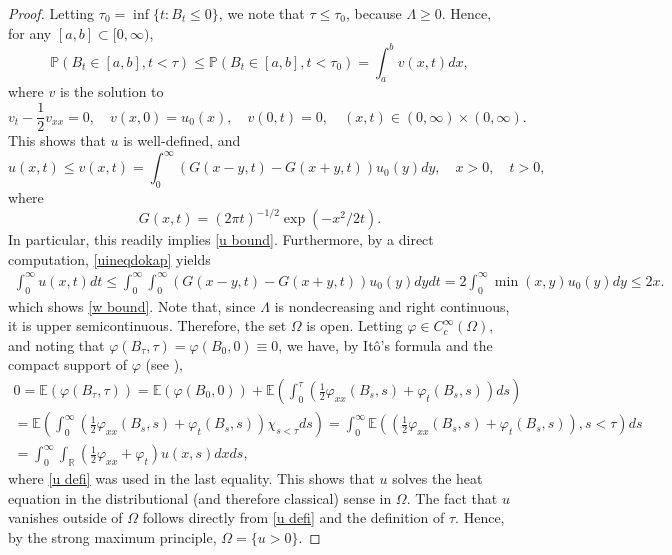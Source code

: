 \documentclass{article}
\numberwithin{equation}{section}
\numberwithin{figure}{section}
\theoremstyle{plain}
\theoremstyle{plain}
\theoremstyle{plain}
\theoremstyle{plain}
\theoremstyle{definition}
\theoremstyle{remark}
\def\R{{\mathbb{R}}}
\def\E{{\mathbb{E}}}
\def\P{{\mathbb{P}}}
\begin{document}
\begin{proof}  Letting $\tau_0=\inf\{t:B_t\leq 0\}$, we note that $\tau\leq \tau_0$, because $\Lambda\geq0$. Hence, for any $[a,b]\subset [0,\infty)$, 
\begin{equation}
   \P(B_t\in [a,b], t< \tau )\leq \P(B_t \in [a,b], t<\tau_0)=\int_{a}^bv(x,t)dx,
\end{equation}
where $v$ is the solution to
\[v_{t}-\frac12v_{xx}=0, \quad v(x,0)=u_0(x), \quad v(0,t)=0, \quad (x,t)\in (0,\infty) \times (0,\infty).\]
This shows that $u$ is well-defined, and
\begin{equation} \label{uineqdokap}
    u(x,t)\leq v(x,t)= \int_{0}^{\infty}(G(x-y,t)-G(x+y,t))u_0(y)dy, \quad x>0, \quad  t>0,
\end{equation}
where
\begin{equation}
    G(x,t)=(2\pi t)^{-1/2}\exp (-x^2/{2t}).
\end{equation}
In particular, this readily implies \eqref{u bound}. Furthermore, by a direct computation, \eqref{uineqdokap} yields
\begin{multline}
\int_0^{\infty}u(x,t)dt \leq \int_0^{\infty}\int_{0}^{\infty}(G(x-y,t)-G(x+y,t))u_0(y)dy dt=2\int_{0}^{\infty} \min(x,y)u_0(y)dy\leq 2x.\end{multline}   
which shows \eqref{w bound}. Note that, since $\Lambda$ is nondecreasing and right continuous, it is upper semicontinuous. Therefore, the set $\Omega$ is open. Letting $\varphi \in C^{\infty}_c(\Omega)$, and noting that $\varphi(B_{\tau},\tau)=\varphi(B_0,0) \equiv 0$, we have, by It\^o's formula and the compact support of $\varphi$ (see \cite[Ch. 3, Cor. 3.6; Ch. 4, Thm. 3.3]{RevYor}),
\begin{multline}\label{qwodkr8}
    0=\E(\varphi(B_{\tau},\tau))= \E(\varphi(B_0,0))+\E\left( \int_{0}^\tau \left(\frac{1}{2}\varphi_{xx}(B_s,s)+\varphi_t(B_s,s)\right)ds\right)
    \\=\E\left( \int_{0}^{\infty} \left(\frac{1}{2}\varphi_{xx}(B_s,s)+\varphi_t(B_s,s)\right)\chi_{s<\tau}ds\right)= \int_{0}^{\infty}\E\left(  \left(\frac{1}{2}\varphi_{xx}(B_s,s)+\varphi_t(B_s,s)\right),s<\tau\right)ds\\=\int_{0}^{\infty}\int_{\R} \left( \frac{1}{2}\varphi_{xx}+\varphi_t\right)u(x,s)dxds,\end{multline}
where \eqref{u defi} was used in the last equality. This shows that $u$ solves the heat equation in the distributional (and therefore classical) sense in $\Omega$.  The fact that $u$ vanishes outside of $\Omega$ follows directly from \eqref{u defi} and the definition of $\tau$. Hence, by the strong maximum principle, $\Omega=\{u>0\}$.
\end{proof}
\end{document}
